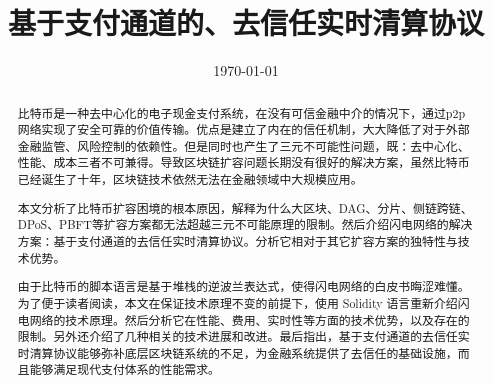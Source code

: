 \documentclass[lang=cn,headings=optiontohead]{elegantpaper}
\title{基于支付通道的、去信任实时清算协议}
\institute{OK区块链工程院}
\date{\today}
\begin{document}
\maketitle
\begin{abstract}

比特币是一种去中心化的电子现金支付系统，在没有可信金融中介的情况下，通过p2p网络实现了安全可靠的价值传输。优点是建立了内在的信任机制，大大降低了对于外部金融监管、风险控制的依赖性。但是同时也产生了三元不可能性问题，既：去中心化、性能、成本三者不可兼得。导致区块链扩容问题长期没有很好的解决方案，虽然比特币已经诞生了十年，区块链技术依然无法在金融领域中大规模应用。

本文分析了比特币扩容困境的根本原因，解释为什么大区块、DAG、分片、侧链跨链、DPoS、PBFT等扩容方案都无法超越三元不可能原理的限制。然后介绍闪电网络的解决方案：基于支付通道的去信任实时清算协议。分析它相对于其它扩容方案的独特性与技术优势。

由于比特币的脚本语言是基于堆栈的逆波兰表达式，使得闪电网络的白皮书晦涩难懂。为了便于读者阅读，本文在保证技术原理不变的前提下，使用 Solidity 语言重新介绍闪电网络的技术原理。然后分析它在性能、费用、实时性等方面的技术优势，以及存在的限制。另外还介绍了几种相关的技术进展和改进。最后指出，基于支付通道的去信任实时清算协议能够弥补底层区块链系统的不足，为金融系统提供了去信任的基础设施，而且能够满足现代支付体系的性能需求。

\end{abstract}

\newpage
\tableofcontents

\newpage







\end{document}
